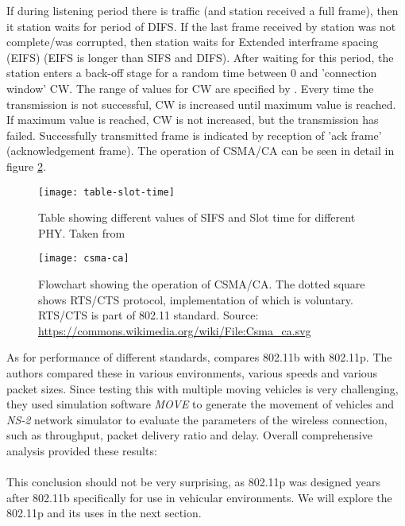 % 
If during listening period there is traffic (and station received a full frame), then it station waits for period of DIFS. If the last frame received by station was not complete/was corrupted, then station waits for Extended interframe spacing (EIFS) (EIFS is longer than SIFS and DIFS). After waiting for this period, the station enters a back-off stage for a random time between 0 and 'connection window' CW. The range of values for CW are specified by \cite{2016IEEEAccess.}. Every time the transmission is not successful, CW is increased until maximum value is reached. If maximum value is reached, CW is not increased, but the transmission has failed. Successfully transmitted frame is indicated by reception of 'ack frame' (acknowledgement frame). The operation of CSMA/CA can be seen in detail in figure \ref{fig:csma-ca}.\par
% 
% 
\begin{figure}[h]
    \centering
    \texttt{[image: table-slot-time]}
    \caption{Table showing different values of SIFS and Slot time for different PHY. Taken from \cite{Aboul-Magd2008WirelessPerspective}}
    \label{fig:table-st}
\end{figure}
% 
\begin{figure}
    \centering
    \texttt{[image: csma-ca]}
    \caption{Flowchart showing the operation of CSMA/CA. The dotted square shows RTS/CTS protocol, implementation of which is voluntary. RTS/CTS is part of 802.11 standard. Source: \url{https://commons.wikimedia.org/wiki/File:Csma_ca.svg}}
    \label{fig:csma-ca}
\end{figure}
% 
As for performance of different standards, \cite{Bilgin2013PerformanceAreas} compares 802.11b with 802.11p. The authors compared these in various environments, various speeds and various packet sizes. Since testing this with multiple moving vehicles is very challenging, they used simulation software \emph{MOVE} to generate the movement of vehicles and \emph{NS-2} network simulator to evaluate the parameters of the wireless connection, such as throughput, packet delivery ratio and delay. 
Overall comprehensive analysis provided these results:\\ \\
This conclusion should not be very surprising, as 802.11p was designed years after 802.11b specifically for use in vehicular environments. We will explore the 802.11p and its uses in the next section.
